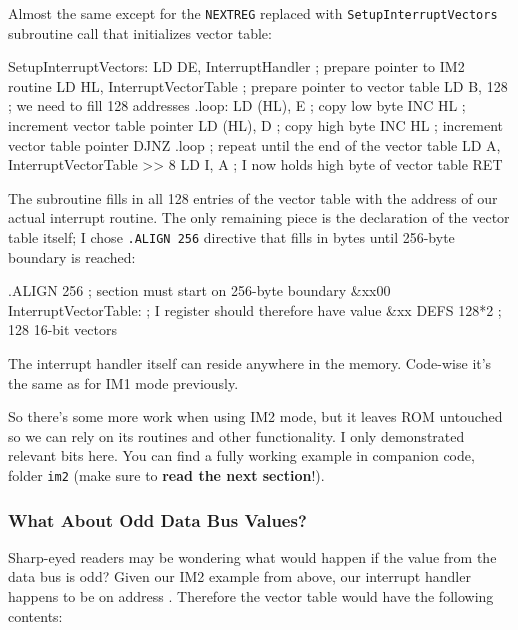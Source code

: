 Almost the same except for the {\tt NEXTREG} replaced with {\tt SetupInterruptVectors} subroutine call that initializes vector table:

\begin{tcblisting}{}
SetupInterruptVectors:
    LD DE, InterruptHandler        ; prepare pointer to IM2 routine
    LD HL, InterruptVectorTable   ; prepare pointer to vector table
    LD B, 128                      ; we need to fill 128 addresses
.loop:
    LD (HL), E                     ; copy low byte
    INC HL                         ; increment vector table pointer
    LD (HL), D                     ; copy high byte
    INC HL                         ; increment vector table pointer
    DJNZ .loop                     ; repeat until the end of the vector table
    LD A, InterruptVectorTable >> 8
    LD I, A                        ; I now holds high byte of vector table
    RET
\end{tcblisting}

The subroutine fills in all 128 entries of the vector table with the address of our actual interrupt routine. The only remaining piece is the declaration of the vector table itself; I chose {\tt .ALIGN 256} directive that fills in bytes until 256-byte boundary is reached:

\begin{tcblisting}{}
    .ALIGN 256                     ; section must start on 256-byte boundary &xx00
InterruptVectorTable:              ; I register should therefore have value &xx
    DEFS 128*2                     ; 128 16-bit vectors	
\end{tcblisting}

The interrupt handler itself can reside anywhere in the memory. Code-wise it's the same as for IM1 mode previously.

So there's some more work when using IM2 mode, but it leaves ROM untouched so we can rely on its routines and other functionality. I only demonstrated relevant bits here. You can find a fully working example in companion code, folder {\tt im2} (make sure to \textbf{read the next section}!).


\subsubsection{What About Odd Data Bus Values?}

Sharp-eyed readers may be wondering what would happen if the value from the data bus is odd? Given our IM2 example from above, our interrupt handler happens to be on address . Therefore the vector table would have the following contents:


